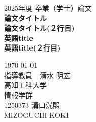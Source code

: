 \documentclass[a4paper]{ltjsreport}
\begin{document}
\thispagestyle{empty}
\begin{center}
    \vspace{20mm}
    {\Large\noindent 2025年度 卒業（学士）論文}\\
    \vspace{40mm}
    {\huge\noindent\textbf{論文タイトル}}\\
    \medskip
    {\huge\noindent\textbf{論文タイトル(２行目)}}\\
    \vspace{\baselineskip}
    {\huge\noindent\textbf{英語title}}\\
    \medskip
    {\huge\noindent\textbf{英語title(２行目)}}\\
    \vspace{40mm}

    {\Large\noindent
    \today\\
    \vspace{\baselineskip}
    指導教員　清水 明宏    \\
    \vspace{\baselineskip}
    高知工科大学\\
    情報学群 \\
    \vspace{\baselineskip}
    1250373 溝口洸熙\\
    {\LARGE M}{\normalsize IZOGUCHI} {\LARGE K}{\normalsize OKI} \\
    }
    \vspace{40mm}

\end{center}

\thispagestyle{empty}
\clearpage
\end{document}
